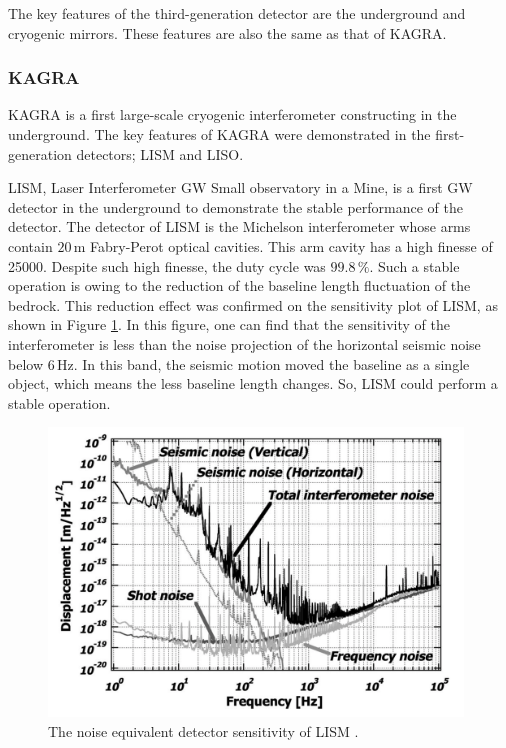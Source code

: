 The key features of the third-generation detector are the underground and cryogenic mirrors. These features are also the same as that of KAGRA.

\subsubsection{KAGRA}
KAGRA is a first large-scale cryogenic interferometer constructing in the underground. The key features of KAGRA were demonstrated in the first-generation detectors; LISM and LISO. 

LISM, Laser Interferometer GW Small observatory in a Mine, is a first GW detector in the underground to demonstrate the stable performance of the detector. The detector of LISM is the Michelson interferometer whose arms contain $20\,\mathrm{m}$ Fabry-Perot optical cavities. This arm cavity has a high finesse of 25000. Despite such high finesse, the duty cycle was $99.8\,\%$. Such a stable operation is owing to the reduction of the baseline length fluctuation of the bedrock. This reduction effect was confirmed on the sensitivity plot of LISM, as shown in Figure \ref{img:img122}. In this figure, one can find that the sensitivity of the interferometer is less than the noise projection of the horizontal seismic noise below $6\,\mathrm{Hz}$. In this band, the seismic motion moved the baseline as a single object, which means the less baseline length changes. So, LISM could perform a stable operation. 

\begin{figure}[h]
  \begin{center}   
    \includegraphics[width=11cm]{./img_chap1/img122.png}
    \caption{The noise equivalent detector sensitivity of LISM \cite{sato2004ultrastable}. } \label{img:img122}
  \end{center}
\end{figure}


